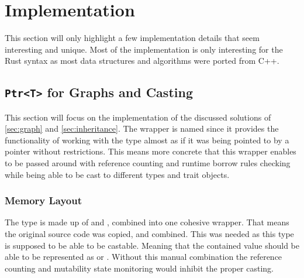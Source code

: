 \documentclass[thesis]{subfiles}
\begin{document}
\chapter{Implementation}
This section will only highlight a few implementation details that seem interesting and unique.
Most of the implementation is only interesting for the Rust syntax as most data structures and algorithms were ported from C++.

\section{\texttt{Ptr<T>} for Graphs and Casting}
  This section will focus on the implementation of the discussed solutions of \autoref{sec:graph} and \autoref{sec:inheritance}.
  The wrapper is named \PtrT since it provides the functionality of working with the type \T almost as if it was being pointed to by a pointer without restrictions.
  This means more concrete that this wrapper enables \T to be passed around with reference counting and runtime borrow rules checking while being able to be cast to different types and trait objects.

  \subsection{Memory Layout}
    The type is made up of \RcT and \RefCellT, combined into one cohesive wrapper.
    That means the original source code was copied, and combined.
    This was needed as this type is supposed to be able to be castable.
    Meaning that the contained value should be able to be represented as \struct or \trait.
    Without this manual combination the reference counting and mutability state monitoring would inhibit the proper casting.

    \newsavebox{\ptrStruct}
    \begin{lrbox}{\ptrStruct}
      \begin{minipage}{.45\linewidth}
        
      \end{minipage}
    \end{lrbox}

    \newsavebox{\rcRefCellStruct}
    \begin{lrbox}{\rcRefCellStruct}
      \begin{minipage}{.45\linewidth}
        
      \end{minipage}
    \end{lrbox}
\end{document}
